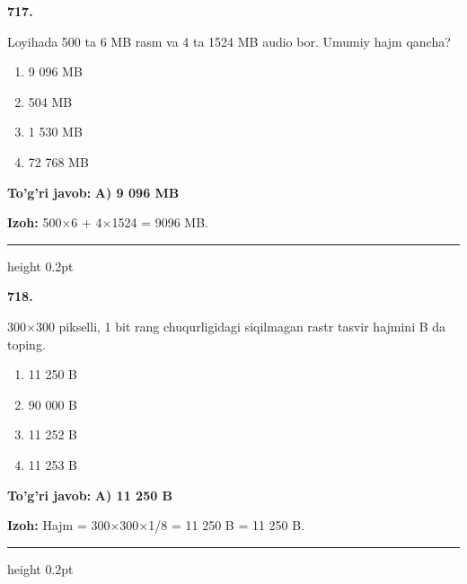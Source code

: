 \documentclass[10pt,a4paper,oneside]{article}
\begin{document}
\noindent\textbf{\color{ink}717.}
\par
Loyihada 500 ta 6 MB rasm va 4 ta 1524 MB audio bor. Umumiy hajm qancha?
\begin{enumerate}[label=\Alph*),leftmargin=9mm]
\item 9 096 MB
\item 504 MB
\item 1 530 MB
\item 72 768 MB
\end{enumerate}
\begin{tcolorbox}[enhanced,breakable,colback=teal!4,colframe=teal!50!black,boxrule=0.5pt,arc=1.1mm,left=3mm,right=3mm,top=1.7mm,bottom=1.7mm,before skip=2mm,after skip=2mm]
\textbf{\color{teal}To'g'ri javob:} \textbf{A) 9 096 MB}
\par\smallskip
\textbf{Izoh:} 500\ensuremath{\times}6 + 4\ensuremath{\times}1524 = 9096 MB.
\end{tcolorbox}
\vspace{2mm}\hrule height 0.2pt \vspace{3mm}

\noindent\textbf{\color{ink}718.}
\par
300\ensuremath{\times}300 pikselli, 1 bit rang chuqurligidagi siqilmagan rastr tasvir hajmini B da toping.
\begin{enumerate}[label=\Alph*),leftmargin=9mm]
\item 11 250 B
\item 90 000 B
\item 11 252 B
\item 11 253 B
\end{enumerate}
\begin{tcolorbox}[enhanced,breakable,colback=teal!4,colframe=teal!50!black,boxrule=0.5pt,arc=1.1mm,left=3mm,right=3mm,top=1.7mm,bottom=1.7mm,before skip=2mm,after skip=2mm]
\textbf{\color{teal}To'g'ri javob:} \textbf{A) 11 250 B}
\par\smallskip
\textbf{Izoh:} Hajm = 300\ensuremath{\times}300\ensuremath{\times}1/8 = 11 250 B = 11 250 B.
\end{tcolorbox}
\vspace{2mm}\hrule height 0.2pt \vspace{3mm}
\end{document}
